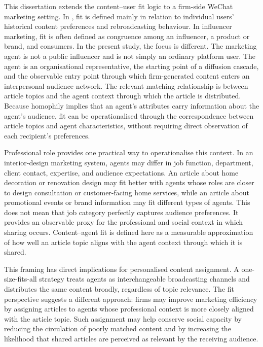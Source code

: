 This dissertation extends the content–user fit logic to a firm-side WeChat marketing setting. In \textcite{zhang2017}, fit is defined mainly in relation to individual users' historical content preferences and rebroadcasting behaviour. In influencer marketing, fit is often defined as congruence among an influencer, a product or brand, and consumers. In the present study, the focus is different. The marketing agent is not a public influencer and is not simply an ordinary platform user. The agent is an organisational representative, the starting point of a diffusion cascade, and the observable entry point through which firm-generated content enters an interpersonal audience network. The relevant matching relationship is between article topics and the agent context through which the article is distributed. Because homophily implies that an agent's attributes carry information about the agent's audience, fit can be operationalised through the correspondence between article topics and agent characteristics, without requiring direct observation of each recipient's preferences.

Professional role provides one practical way to operationalise this context. In an interior-design marketing system, agents may differ in job function, department, client contact, expertise, and audience expectations. An article about home decoration or renovation design may fit better with agents whose roles are closer to design consultation or customer-facing home services, while an article about promotional events or brand information may fit different types of agents. This does not mean that job category perfectly captures audience preferences. It provides an observable proxy for the professional and social context in which sharing occurs. Content–agent fit is defined here as a measurable approximation of how well an article topic aligns with the agent context through which it is shared.

This framing has direct implications for personalised content assignment. A one-size-fits-all strategy treats agents as interchangeable broadcasting channels and distributes the same content broadly, regardless of topic relevance. The fit perspective suggests a different approach: firms may improve marketing efficiency by assigning articles to agents whose professional context is more closely aligned with the article topic. Such assignment may help conserve social capacity by reducing the circulation of poorly matched content and by increasing the likelihood that shared articles are perceived as relevant by the receiving audience.


